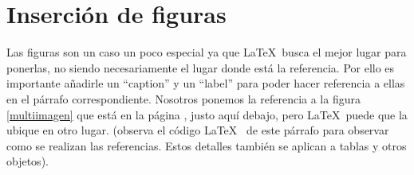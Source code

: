 \newpage



\section{Inserción de figuras}


Las figuras son un caso un poco especial ya que \LaTeX~busca el mejor lugar para ponerlas, no siendo necesariamente el lugar donde está la referencia. Por ello es importante añadirle un ``caption'' y un ``label'' para poder hacer referencia a ellas en el párrafo correspondiente. Nosotros ponemos la referencia a la figura \ref{multiimagen} que está en la página \pageref{multiimagen}, justo aquí debajo, pero \LaTeX ~puede que la ubique en otro lugar. (observa el código \LaTeX~ de este párrafo para observar como se realizan las referencias. Estos detalles también se aplican a tablas y otros objetos).



